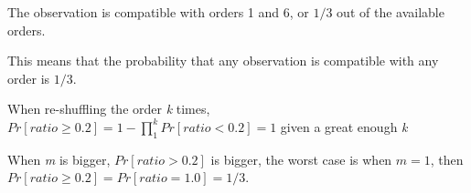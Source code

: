 \documentclass[11pt, a4paper]{article}
\begin{document}
\noindent The observation is compatible with orders 1 and 6, or 
$1/3$ out of the available orders. 

\noindent This means that the probability that any observation is
compatible with any order is $1/3$.

\noindent When re-shuffling the order \textit{k} times, $Pr[ratio \ge 0.2] = 1 - \prod_{1}^{k} Pr[ratio < 0.2] = 1$ given a great enough \textit{k}

\noindent When \textit{m} is bigger, $Pr[ratio > 0.2]$ is bigger,
the worst case is when $\textit{m} = 1$, then $Pr[ratio \ge 0.2] = Pr[ratio = 1.0] = 1/3$.
\end{document}
